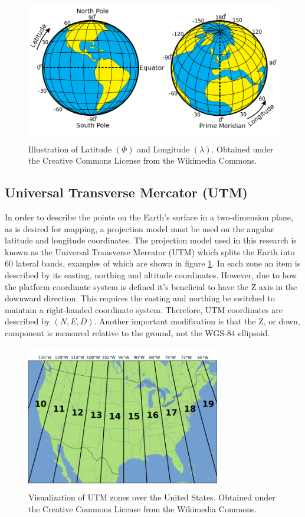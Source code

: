 \begin{figure}[tbh]
	\centering
    \includegraphics[height=2.5in]{figures/latitudelongitude.png}
    \caption[Latitude and longitude]{Illustration of Latitude $(\Phi)$ and Longitude $(\lambda)$. Obtained under the Creative Commons License from the Wikimedia Commons.}
\end{figure}

\subsection{Universal Transverse Mercator (UTM)}
\label{section:utm}

In order to describe the points on the Earth's surface in a two-dimension plane, as is desired for mapping, a projection model must be used on the angular latitude and longitude coordinates.  The projection model used in this research is known as the Universal Transverse Mercator (UTM) which splits the Earth into 60 lateral bands, examples of which are shown in figure \ref{utm_zones}.  In each zone an item is described by its easting, northing and altitude coordinates.  However, due to how the platform coordinate system is defined it's beneficial to have the Z axis in the downward direction.  This requires the easting and northing be switched to maintain a right-handed coordinate system. Therefore, UTM coordinates are described by $(N,E,D)$.  Another important modification is that the Z, or down, component is measured relative to the ground, not the WGS-84 ellipsoid. 

\begin{figure}[tbh]
	\centering
    \includegraphics[height=2.5in]{figures/utm_zones.png}
    \caption[UTM zones]{Visualization of UTM zones over the United States. Obtained under the Creative Commons License from the Wikimedia Commons.}
    \label{utm_zones}
\end{figure}

